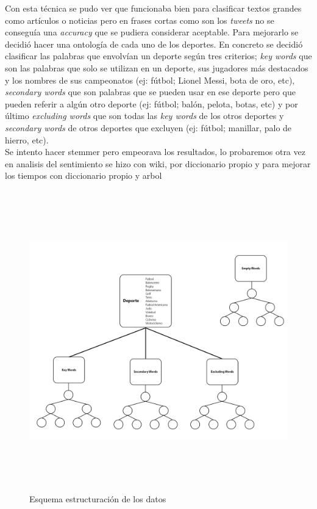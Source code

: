 \documentclass[../all.tex]{subfiles}
\begin{document}
Con esta técnica se pudo ver que funcionaba bien para clasificar textos grandes como artículos o noticias pero en frases cortas como son los \textit{tweets} no se conseguía una \textit{accuracy} que se pudiera considerar aceptable. Para mejorarlo se decidió hacer una ontología de cada uno de los deportes. En concreto se decidió clasificar las palabras que envolvían un deporte según tres criterios; \textit{key words} que son las palabras que solo se utilizan en un deporte, sus jugadores más destacados y los nombres de sus campeonatos (ej: fútbol; Lionel Messi, bota de oro, etc), \textit{secondary words} que son palabras que se pueden usar en ese deporte pero que pueden referir a algún otro deporte (ej: fútbol; balón, pelota, botas, etc) y por último \textit{excluding words} que son todas las \textit{key words} de los otros deportes y \textit{secondary words} de otros deportes que excluyen (ej: fútbol; manillar, palo de hierro, etc).\\

Se intento hacer stemmer pero empeorava los resultados, lo probaremos otra vez en analisis del sentimiento
se hizo con wiki, por  diccionario propio y para mejorar los tiempos con diccionario propio y arbol

\begin{figure}[H]
    \centering
    \includegraphics[height=13cm, width=15cm]{imgs/treeScheme.png}
    \caption{Esquema estructuración de los datos}
\end{figure}
\end{document}
